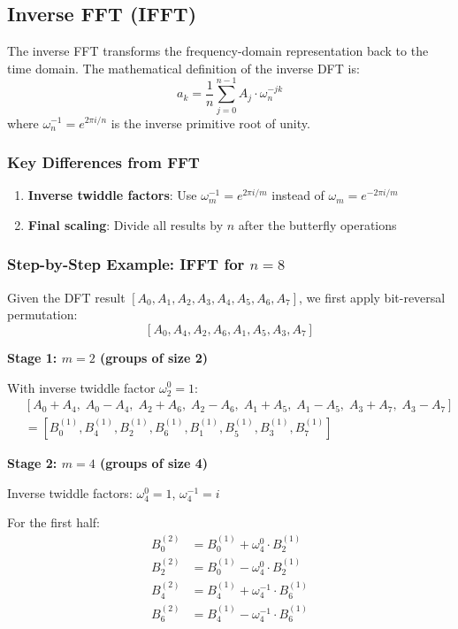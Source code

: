 \documentclass[a4paper]{article}
\theoremstyle{definition}
\begin{document}
\subsection{Inverse FFT (IFFT)}

The inverse FFT transforms the frequency-domain representation back to the time domain.
The mathematical definition of the inverse DFT is:
\[
a_k = \frac{1}{n} \sum_{j=0}^{n-1} A_j \cdot \omega_n^{-jk}
\]
where \(\omega_n^{-1} = e^{2\pi i / n}\) is the inverse primitive root of unity.

\subsubsection{Key Differences from FFT}

\begin{enumerate}
    \item \textbf{Inverse twiddle factors}: Use \(\omega_m^{-1} = e^{2\pi i / m}\) instead of \(\omega_m = e^{-2\pi i / m}\)
    \item \textbf{Final scaling}: Divide all results by \(n\) after the butterfly operations
\end{enumerate}

\subsubsection{Step-by-Step Example: IFFT for \(n=8\)}

Given the DFT result \([A_0, A_1, A_2, A_3, A_4, A_5, A_6, A_7]\), we first apply bit-reversal permutation:
\[
[A_0, A_4, A_2, A_6, A_1, A_5, A_3, A_7]
\]

\textbf{Stage 1: \(m=2\) (groups of size 2)}

With inverse twiddle factor \(\omega_2^0 = 1\):
\begin{align*}
\ &[A_0 + A_4, \; A_0 - A_4, \; A_2 + A_6, \; A_2 - A_6, \; A_1 + A_5, \; A_1 - A_5, \; A_3 + A_7, \; A_3 - A_7] \\
\ &= [B_0^{(1)}, B_4^{(1)}, B_2^{(1)}, B_6^{(1)}, B_1^{(1)}, B_5^{(1)}, B_3^{(1)}, B_7^{(1)}]
\end{align*}

\textbf{Stage 2: \(m=4\) (groups of size 4)}

Inverse twiddle factors: \(\omega_4^0 = 1\), \(\omega_4^{-1} = i\)

For the first half:
\begin{align*}
B_0^{(2)} &= B_0^{(1)} + \omega_4^0 \cdot B_2^{(1)} \\
B_2^{(2)} &= B_0^{(1)} - \omega_4^0 \cdot B_2^{(1)} \\
B_4^{(2)} &= B_4^{(1)} + \omega_4^{-1} \cdot B_6^{(1)} \\
B_6^{(2)} &= B_4^{(1)} - \omega_4^{-1} \cdot B_6^{(1)}
\end{align*}
\end{document}
